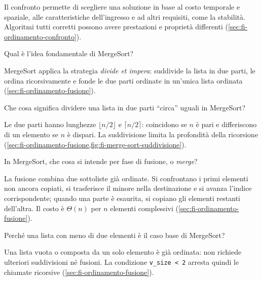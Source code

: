 Il confronto permette di scegliere una soluzione in base al
costo temporale e spaziale, alle caratteristiche dell'ingresso
e ad altri requisiti, come la stabilità. Algoritmi tutti
corretti possono avere prestazioni e proprietà differenti
(\cref{sec:fi-ordinamento-confronto}).

\begin{exercise}
\label{ex:fi-esercizi-ricerca-ordinamento-merge-idea}
Qual è l'idea fondamentale di MergeSort?
\end{exercise}

MergeSort applica la strategia \emph{divide et impera}:
suddivide la lista in due parti, le ordina ricorsivamente
e fonde le due parti ordinate in un'unica lista ordinata
(\cref{sec:fi-ordinamento-fusione}).

\begin{exercise}
\label{ex:fi-esercizi-ricerca-ordinamento-merge-meta}
Che cosa significa dividere una lista in due parti
``circa'' uguali in MergeSort?
\end{exercise}

Le due parti hanno lunghezze \(\lfloor n/2\rfloor\) e
\(\lceil n/2\rceil\): coincidono se \(n\) è pari e
differiscono di un elemento se \(n\) è dispari. La
suddivisione limita la profondità della ricorsione
(\cref{sec:fi-ordinamento-fusione,fig:fi-merge-sort-suddivisione}).

\begin{exercise}
\label{ex:fi-esercizi-ricerca-ordinamento-merge-fusione}
In MergeSort, che cosa si intende per fase di fusione,
o \emph{merge}?
\end{exercise}

La fusione combina due sottoliste già ordinate. Si confrontano
i primi elementi non ancora copiati, si trasferisce il minore
nella destinazione e si avanza l'indice corrispondente;
quando una parte è esaurita, si copiano gli elementi restanti
dell'altra. Il costo è \(\Theta(n)\) per \(n\) elementi complessivi
(\cref{sec:fi-ordinamento-fusione}).

\begin{exercise}
\label{ex:fi-esercizi-ricerca-ordinamento-merge-caso-base}
Perché una lista con meno di due elementi è il caso base
di MergeSort?
\end{exercise}

Una lista vuota o composta da un solo elemento è già ordinata:
non richiede ulteriori suddivisioni né fusioni. La condizione
\lstinline|v_size < 2| arresta quindi le chiamate ricorsive
(\cref{sec:fi-ordinamento-fusione}).

